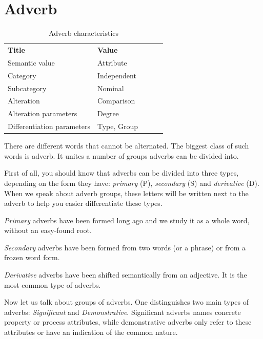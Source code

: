 \section{Adverb}

\begin{table}[h]
	\caption{Adverb characteristics}
	\begin{tabular}{lllll}
		\textbf{Title}              & \textbf{Value}      \\
		Semantic value              & Attribute           \\
		Category                    & Independent         \\
		Subcategory                 & Nominal             \\
		Alteration                  & Comparison          \\
		Alteration parameters       & Degree              \\
		Differentiation parameters  & Type, Group
	\end{tabular}
\end{table}

There are different words that cannot be alternated. The biggest class of such words is adverb. It unites a number of groups adverbs can be divided into.

First of all, you should know that adverbs can be divided into three types, depending on the form they have: \textit{primary} (P), \textit{secondary} (S) and \textit{derivative} (D). When we speak about adverb groups, these letters will be written next to the adverb to help you easier differentiate these types.

\textit{Primary} adverbs have been formed long ago and we study it as a whole word, without an easy-found root.

\textit{Secondary} adverbs have been formed from two words (or a phrase) or from a frozen word form. 

\textit{Derivative} adverbs have been shifted semantically from an adjective. It is the most common type of adverbs.

Now let us talk about groups of adverbs. One distinguishes two main types of adverbs: \textit{Significant} and \textit{Demonstrative}. Significant adverbs names concrete property or process attributes, while demonstrative adverbs only refer to these attributes or have an indication of the common nature.

